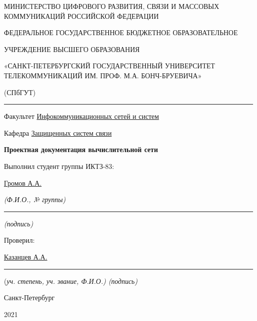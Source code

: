 \documentclass[a4paper,14pt]{extarticle}
\begin{document}
    \begin{center}
        \thispagestyle{empty}
        \begin{singlespace}
        МИНИСТЕРСТВО ЦИФРОВОГО РАЗВИТИЯ, СВЯЗИ И МАССОВЫХ КОММУНИКАЦИЙ РОССИЙСКОЙ ФЕДЕРАЦИИ

        ФЕДЕРАЛЬНОЕ ГОСУДАРСТВЕННОЕ БЮДЖЕТНОЕ ОБРАЗОВАТЕЛЬНОЕ

        УЧРЕЖДЕНИЕ ВЫСШЕГО ОБРАЗОВАНИЯ

        «САНКТ-ПЕТЕРБУРГСКИЙ ГОСУДАРСТВЕННЫЙ УНИВЕРСИТЕТ ТЕЛЕКОММУНИКАЦИЙ ИМ. ПРОФ. М.А. БОНЧ-БРУЕВИЧА»

        (СПбГУТ)
        \end{singlespace}
        \vspace{-1ex}
        \rule{\textwidth}{0.4pt}
        \vspace{-5ex}

        Факультет \underline{Инфокоммуникационных сетей и систем}

        Кафедра \underline{Защищенных систем связи}
        \vspace{10ex}

        \textbf{Проектная документация вычислительной сети}
        


    \end{center}
    \vspace{4ex}
    \begin{flushright}
    \parbox{10 cm}{
    \begin{flushleft}
        Выполнил студент группы ИКТЗ-83:

        \underline{Громов А.А.} \hfill 

        \footnotesize \textit{ (Ф.И.О., № группы)} \hfill \rule[-0.85ex]{0.1\textwidth}{0.6pt}
        
        \hfill \textit{(подпись)} \normalsize

        Проверил:

        \underline{Казанцев А.А.} \hfill \rule[-0.85ex]{0.1\textwidth}{0.6pt}

        (\footnotesize \textit{уч. степень, уч. звание, Ф.И.О.) \hfill (подпись)} \normalsize

    \end{flushleft}
    }
    \end{flushright}
    \begin{center}
        \vfill
        Санкт-Петербург

        2021

    \end{center}
    \newpage
\end{document}
